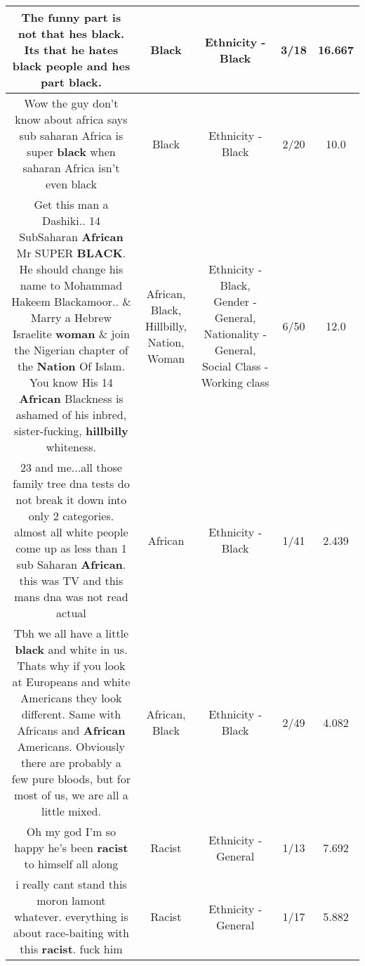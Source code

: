\documentclass[11pt]{article}
\newlength\mylength
\begin{document}
\begin{center}
\begin{longtable}{|C{.65\mylength}|C{.30\mylength}|C{.12\mylength}|C{.12\mylength}|C{.12\mylength}|}
  \small The funny part is not that hes \textbf{black}. Its that he hates \textbf{black} people and hes part \textbf{black}.\normalsize   & Black & Ethnicity - Black & 3/18 & 16.667 \\  \hline
  \small Wow the guy don't know about africa says sub saharan Africa is super \textbf{black} when saharan Africa isn't even black\normalsize   & Black & Ethnicity - Black & 2/20 & 10.0 \\  \hline
  \small Get this man a Dashiki.. 14 SubSaharan \textbf{African} Mr SUPER \textbf{BLACK}. He should change his name to Mohammad Hakeem Blackamoor.. \& Marry a Hebrew Israelite \textbf{woman} \& join the Nigerian chapter of the \textbf{Nation} Of Islam. You know His 14 \textbf{African} Blackness is ashamed of his inbred, sister-fucking, \textbf{hillbilly} whiteness.\normalsize   & African, Black, Hillbilly, Nation, Woman & Ethnicity - Black, Gender - General, Nationality - General, Social Class - Working class & 6/50 & 12.0 \\  \hline
  \small 23 and me...all those family tree dna tests do not break it down into only 2 categories. almost all white people come up as less than 1 sub Saharan \textbf{African}. this was TV and this mans dna was not read actual\normalsize   & African & Ethnicity - Black & 1/41 & 2.439 \\  \hline
  \small Tbh we all have a little \textbf{black} and white in us. Thats why if you look at Europeans and white Americans they look different. Same with Africans and \textbf{African} Americans. Obviously there are probably a few pure bloods, but for most of us, we are all a little mixed.\normalsize   & African, Black & Ethnicity - Black & 2/49 & 4.082 \\  \hline
  \small Oh my god I'm so happy he's been \textbf{racist} to himself all along\normalsize   & Racist & Ethnicity - General & 1/13 & 7.692 \\  \hline
  \small i really cant stand this moron lamont whatever.  everything is about race-baiting with this \textbf{racist}.   fuck him\normalsize   & Racist & Ethnicity - General & 1/17 & 5.882 \\  \hline

\end{longtable}
\end{center}
\end{document}
